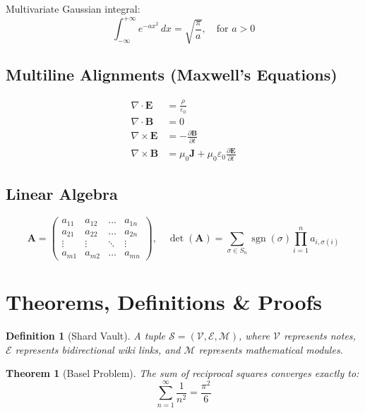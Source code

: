 \documentclass[11pt, a4paper]{article}
\newtheorem{theorem}{Theorem}[section]
\newtheorem{definition}{Definition}[section]
\begin{document}
Multivariate Gaussian integral:
\begin{equation}
\label{eq:gauss}
\int_{-\infty}^{+\infty} e^{-a x^2} \, dx = \sqrt{\frac{\pi}{a}}, \quad \text{for } a > 0
\end{equation}

\subsection{Multiline Alignments (Maxwell's Equations)}
\begin{align}
\nabla \cdot \mathbf{E} &= \frac{\rho}{\varepsilon_0} \label{eq:maxwell1} \\
\nabla \cdot \mathbf{B} &= 0 \label{eq:maxwell2} \\
\nabla \times \mathbf{E} &= -\frac{\partial \mathbf{B}}{\partial t} \label{eq:maxwell3} \\
\nabla \times \mathbf{B} &= \mu_0 \mathbf{J} + \mu_0 \varepsilon_0 \frac{\partial \mathbf{E}}{\partial t} \label{eq:maxwell4}
\end{align}

\subsection{Linear Algebra}
\begin{equation}
\mathbf{A} = 
\begin{pmatrix}
a_{11} & a_{12} & \dots & a_{1n} \\
a_{21} & a_{22} & \dots & a_{2n} \\
\vdots & \vdots & \ddots & \vdots \\
a_{m1} & a_{m2} & \dots & a_{mn}
\end{pmatrix},
\quad
\det(\mathbf{A}) = \sum_{\sigma \in S_n} \operatorname{sgn}(\sigma) \prod_{i=1}^n a_{i, \sigma(i)}
\end{equation}

\section{Theorems, Definitions \& Proofs}
\label{sec:theorems}

\begin{definition}[Shard Vault]
A tuple $\mathcal{S} = (\mathcal{V}, \mathcal{E}, \mathcal{M})$, where $\mathcal{V}$ represents notes, $\mathcal{E}$ represents bidirectional wiki links, and $\mathcal{M}$ represents mathematical modules.
\end{definition}

\begin{theorem}[Basel Problem]
The sum of reciprocal squares converges exactly to:
\begin{equation}
\sum_{n=1}^{\infty} \frac{1}{n^2} = \frac{\pi^2}{6}
\end{equation}
\end{theorem}
\end{document}
